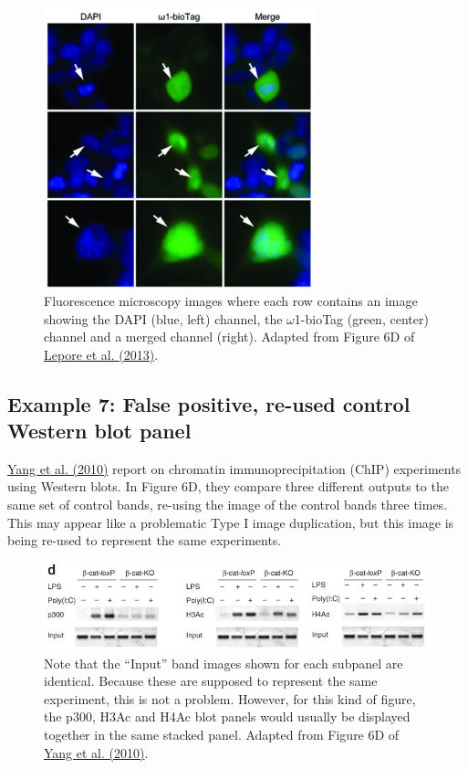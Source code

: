 \documentclass[letterpaper, 12pt]{article}
\begin{document}
\begin{figure}[h!tbp]
    \centering
    \includegraphics[width=0.7\textwidth]{img/image_duplication/merge.JPG}
    \caption*{Fluorescence microscopy images where each row contains an image showing the DAPI (blue, left) channel, the $\omega$1-bioTag (green, center) channel and a merged channel (right). Adapted from Figure 6D of \href{https://doi.org/10.1371/journal.pone.0083018}{Lepore et al. (2013)}.}
\end{figure}

\pagebreak

\subsection*{Example 7: False positive, re-used control Western blot panel}

\href{https://doi.org/10.1038/ni.1876}{Yang et al. (2010)} report on chromatin immunoprecipitation (ChIP) experiments using Western blots. In Figure 6D, they compare three different outputs to the same set of control bands, re-using the image of the control bands three times. This may appear like a problematic Type I image duplication, but this image is being re-used to represent the same experiments.

\begin{figure}[h!tbp]
    \centering
    \includegraphics[width=\textwidth]{img/image_duplication/yang_fig_6d.png}
    \caption*{Note that the ``Input'' band images shown for each subpanel are identical. Because these are supposed to represent the same experiment, this is not a problem. However, for this kind of figure, the p300, H3Ac and H4Ac blot panels would usually be displayed together in the same stacked panel. Adapted from Figure 6D of \href{https://doi.org/10.1038/ni.1876}{Yang et al. (2010)}.}
\end{figure}
\end{document}
